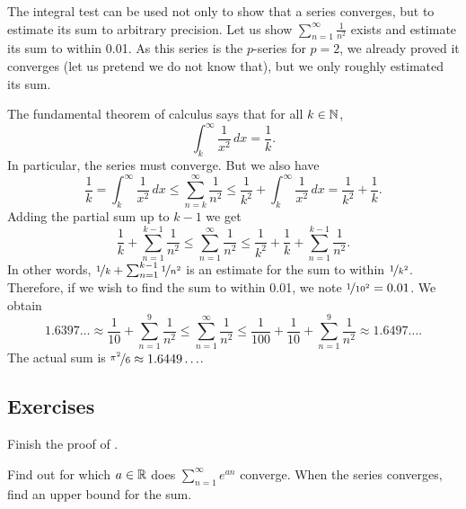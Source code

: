 \begin{example}
The integral test can be used not only to show that a series converges, but to
estimate its sum to arbitrary precision.
Let us show $\sum_{n=1}^\infty \frac{1}{n^2}$ exists and
estimate its sum to within 0.01.  As this series is the $p$-series for
$p=2$, we already proved it converges (let us pretend we do not know that),
but we only roughly estimated its sum.

The fundamental theorem of calculus says that for all $k \in {\mathbb{N}}$,
\begin{equation*}
\int_{k}^\infty \frac{1}{x^2}\,dx = \frac{1}{k} .
\end{equation*}
In particular, the series must converge.  But we also have
\begin{equation*}
\frac{1}{k} = \int_k^\infty \frac{1}{x^2}\,dx
\leq
\sum_{n=k}^\infty \frac{1}{n^2}
\leq
\frac{1}{k^2}
+
\int_k^\infty \frac{1}{x^2}\,dx
=
\frac{1}{k^2}
+
\frac{1}{k} .
\end{equation*}
Adding the partial sum up to $k-1$ we get
\begin{equation*}
\frac{1}{k} + \sum_{n=1}^{k-1} \frac{1}{n^2}
\leq
\sum_{n=1}^\infty \frac{1}{n^2}
\leq
\frac{1}{k^2}
+
\frac{1}{k} + \sum_{n=1}^{k-1} \frac{1}{n^2} .
\end{equation*}
In other words,
$\nicefrac{1}{k} + \sum_{n=1}^{k-1} \nicefrac{1}{n^2}$ is an estimate for
the sum to within $\nicefrac{1}{k^2}$.  Therefore, if we wish to
find the sum to within 0.01, we note $\nicefrac{1}{{10}^2} = 0.01$.  We
obtain
\begin{equation*}
1.6397\ldots
\approx
\frac{1}{10} + \sum_{n=1}^{9} \frac{1}{n^2}
\leq
\sum_{n=1}^\infty \frac{1}{n^2}
\leq
\frac{1}{100}
+
\frac{1}{10} + \sum_{n=1}^{9} \frac{1}{n^2}
\approx
1.6497\ldots .
\end{equation*}
The actual sum is $\nicefrac{\pi^2}{6} \approx 1.6449\ldots$. 
\end{example}

\subsection{Exercises}

\begin{exercise}
Finish the proof of .
\end{exercise}

\begin{exercise}
Find out for which $a \in {\mathbb{R}}$ does $\sum_{n=1}^\infty e^{an}$ converge.
When the series converges, find an upper bound for the sum.
\end{exercise}

